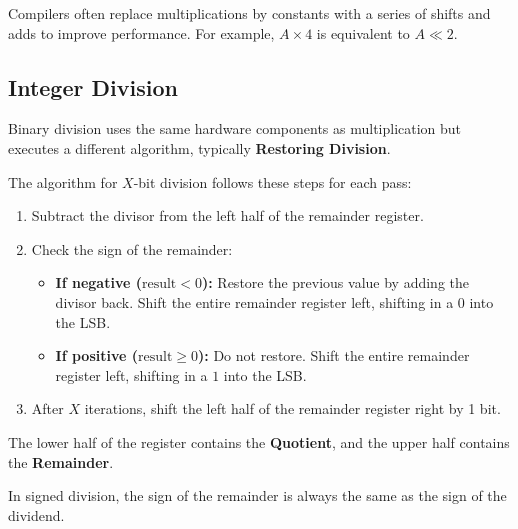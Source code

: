 \medskip

\begin{example}
Compilers often replace multiplications by constants with a series of shifts and adds to improve performance. For example, $A \times 4$ is equivalent to $A \ll 2$.
\end{example}

\subsection{Integer Division}

Binary division uses the same hardware components as multiplication but executes a different algorithm, typically \textbf{Restoring Division}.

\medskip

\begin{proposition}
The algorithm for $X$-bit division follows these steps for each pass:

\begin{enumerate}
    \item Subtract the divisor from the left half of the remainder register.
    \item Check the sign of the remainder:

    \begin{itemize}
        \item \textbf{If negative ($\text{result} < 0$):} Restore the previous value by adding the divisor back. Shift the entire remainder register left, shifting in a $0$ into the LSB.
        \item \textbf{If positive ($\text{result} \geq 0$):} Do not restore. Shift the entire remainder register left, shifting in a $1$ into the LSB.
    \end{itemize}

    \item After $X$ iterations, shift the left half of the remainder register right by 1 bit.
\end{enumerate}

The lower half of the register contains the \textbf{Quotient}, and the upper half contains the \textbf{Remainder}.
\end{proposition}

\medskip

\begin{remark}
In signed division, the sign of the remainder is always the same as the sign of the dividend.
\end{remark}

